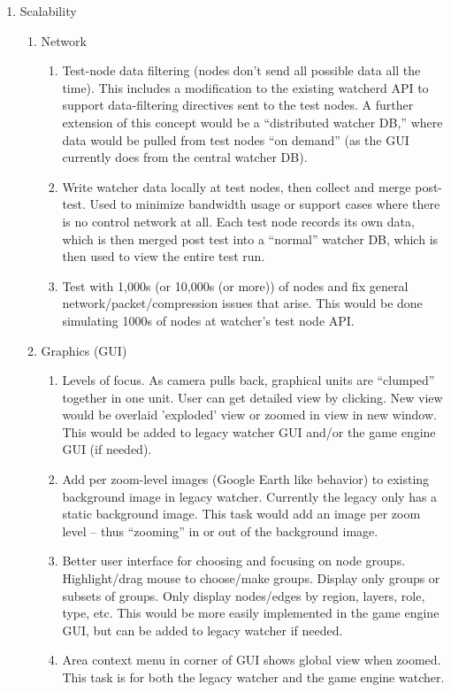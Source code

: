 \documentclass{report}
\begin{document}
\begin{enumerate}
\item Scalability 
\begin{enumerate}
    \item Network 
    \begin{enumerate}
        \item Test-node data filtering (nodes don't send all possible data all the time). This includes a modification to the existing watcherd API to support data-filtering directives sent to the test nodes.  A further extension of this concept would be a “distributed watcher DB,” where data would be pulled from test nodes “on demand” (as the GUI currently does from the central watcher DB).
        \item Write watcher data locally at test nodes, then collect and merge post-test. Used to minimize bandwidth usage or support cases where there is no control network at all. Each test node records its own data, which is then merged post test into a “normal” watcher DB, which is then used to view the entire test run.
         \item Test with 1,000s (or 10,000s (or more)) of nodes and fix general network/packet/compression issues that arise. This would be done simulating 1000s of nodes at watcher's test node API. 
    \end{enumerate}
    \item Graphics (GUI) 
    \begin{enumerate}
        \item Levels of focus. As camera pulls back, graphical units are “clumped” together in one unit. User can get detailed view by clicking. New view would be overlaid 'exploded' view or zoomed in view in new window. This would be added to legacy watcher GUI and/or the game engine GUI (if needed). 
        \item Add per zoom-level images (Google Earth like behavior) to existing background image in legacy watcher. Currently the legacy only has a static background image. This task would add an image per zoom level – thus “zooming” in or out of the background image. 
        \item Better user interface for choosing and focusing on node groups. Highlight/drag mouse to choose/make groups. Display only groups or subsets of groups. Only display nodes/edges by region, layers, role, type, etc. This would be more easily implemented in the game engine GUI, but can be added to legacy watcher if needed.
        \item Area context menu in corner of GUI shows global view when zoomed. This task is for both the legacy watcher and the game engine watcher. 

\end{enumerate}
\end{enumerate}
\end{enumerate}
\end{document}
